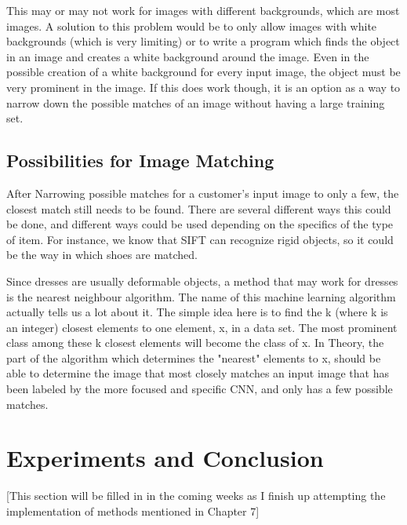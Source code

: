 \documentclass[12pt]{report} %
\begin{document}
	This may or may not work for images with different backgrounds, which are most images. A solution to this problem would be to only allow images with white backgrounds (which is very limiting) or to write a program which finds the object in an image and creates a white background around the image. Even in the possible creation of a white background for every input image, the object must be very prominent in the image.  If this does work though, it is an option as a way to narrow down the possible matches of an image without having a large training set.
	
\section{Possibilities for Image Matching}
	After Narrowing possible matches for a customer's input image to only a few, the closest match still needs to be found. There are several different ways this could be done, and different ways could be used depending on the specifics of the type of item. For instance, we know that SIFT\cite{lowe1999object} can recognize rigid objects, so it could be the way in which shoes are matched. 
	
	Since dresses are usually deformable objects, a method that may work for dresses is the nearest neighbour algorithm. The name of this machine learning algorithm actually tells us a lot about it. The simple idea here is to find the k (where k is an integer) closest elements to one element, x,  in a data set. The most prominent class among these k closest elements will become the class of x. In Theory, the part of the algorithm which determines the "nearest" elements to x, should be able to determine the image that most closely matches an input image that has been labeled by the more focused and specific CNN, and only has a few possible matches.\cite{nearestNeighbour}

\chapter{Experiments and Conclusion}
[This section will be filled in in the coming weeks as I finish up attempting the implementation of methods mentioned in Chapter 7]
		


\end{document}
